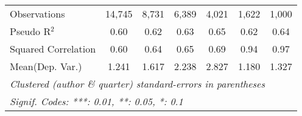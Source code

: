\begin{tabular}{lcccccc}
   Observations                                               & 14,745  & 8,731   & 6,389   & 4,021   & 1,622        & 1,000\\  
   Pseudo R$^2$                                               & 0.60    & 0.62    & 0.63    & 0.65    & 0.62         & 0.64\\  
   Squared Correlation                                        & 0.60    & 0.64    & 0.65    & 0.69    & 0.94         & 0.97\\  
Mean(Dep. Var.) & 1.241 & 1.617 & 2.238 & 2.827 & 1.180 & 1.327 \\
   \midrule \midrule
   \multicolumn{7}{l}{\emph{Clustered (author \& quarter) standard-errors in parentheses}}\\
   \multicolumn{7}{l}{\emph{Signif. Codes: ***: 0.01, **: 0.05, *: 0.1}}\\
\end{tabular}
\par\endgroup
